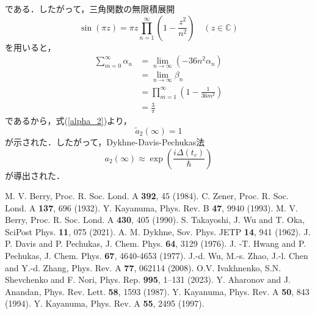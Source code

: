 \documentclass[a4paper, titlepage]{jsreport}
\begin{document}
である．したがって，三角関数の無限積展開
\begin{equation}
  \sin (\pi z) = \pi z \prod_{n=1}^{\infty} \left( 1-\frac{z^2}{n^2} \right) \quad (z \in \mathbb{C})
\end{equation}
を用いると，
\begin{align}
  \sum_{m=0}^{\infty} \alpha_n &= \lim_{n \rightarrow \infty} (-36n^2 \alpha_n)\\
  &= \lim_{n \rightarrow \infty} \beta_n\\
  &= \prod_{m=1}^{\infty} \left( 1-\frac{1}{36m^2} \right)\\
  &= \frac{3}{\pi}
\end{align}
であるから，式(\ref{alpha_2})より，
\begin{equation}
  \tilde{a}_2(\infty) = 1
\end{equation}
が示された．したがって，Dykhne-Davis-Pechukas法
\begin{equation}
  a_2(\infty) \approx \exp \left( \frac{i\Delta(t_c)}{\hbar} \right)
\end{equation}
が導出された．



\begin{thebibliography}{99}
    M. V. Berry, Proc. R. Soc. Lond. A {\bf 392}, 45 (1984).
   C. Zener, Proc. R. Soc. Lond. A {\bf 137}, 696 (1932).
   Y. Kayanuma, Phys. Rev. B {\bf 47}, 9940 (1993).
   M. V. Berry, Proc. R. Soc. Lond. A {\bf 430}, 405 (1990).
   S. Takayoshi, J. Wu and T. Oka, SciPost Phys. {\bf 11}, 075 (2021).
   A. M. Dykhne, Sov. Phys. JETP {\bf 14}, 941 (1962).
   J. P. Davis and P. Pechukas, J. Chem. Phys. {\bf 64}, 3129 (1976).
   J. -T. Hwang and P. Pechukas, J. Chem. Phys. {\bf 67}, 4640-4653 (1977).
   J.-d. Wu, M.-s. Zhao, J.-l. Chen and Y.-d. Zhang, Phys. Rev. A {\bf 77}, 062114 (2008).
   O.V. Ivakhnenko, S.N. Shevchenko and F. Nori, Phys. Rep. {\bf 995}, 1–131 (2023).
   Y. Aharonov and J. Anandan, Phys. Rev. Lett. {\bf 58}, 1593 (1987).
   Y. Kayanuma, Phys. Rev. A {\bf 50}, 843 (1994).
   Y. Kayanuma, Phys. Rev. A {\bf 55}, 2495 (1997).
\end{thebibliography}
\end{document}
